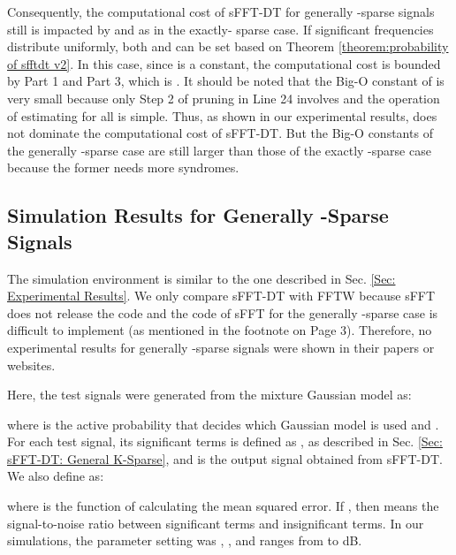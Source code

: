 \documentclass[journal,onecolumn,11pt]{IEEEtran}
\begin{document}
Consequently, the computational cost of sFFT-DT for generally -sparse signals still is impacted by  and  as in the exactly- sparse case.
If significant frequencies distribute uniformly, both  and  can be set based on Theorem \ref{theorem:probability of sfftdt v2}.
In this case, since  is a constant, the computational cost is bounded by Part 1 and Part 3, which is .
It should be noted that the Big-O constant of  is very small because only Step 2 of pruning in Line 24 involves  and the operation of estimating  for all  is simple.
Thus, as shown in our experimental results,  does not dominate the computational cost of sFFT-DT.
But the Big-O constants of the generally -sparse case are still larger than those of the exactly -sparse case because the former needs more syndromes.

\subsection{Simulation Results for Generally -Sparse Signals}\label{Sec: experimental result of General}
The simulation environment is similar to the one described in Sec. \ref{Sec: Experimental Results}.
We only compare sFFT-DT with FFTW because sFFT \cite{Haitham2012}\cite{Haitham2012_1} does not release the code and the code of sFFT for the generally -sparse case is difficult to implement (as mentioned in the footnote on Page 3).
Therefore, no experimental results for generally -sparse signals were shown in their papers or websites.

Here, the test signals were generated from the mixture Gaussian model as:
\small

\normalsize
where  is the active probability that decides which Gaussian model is used and . For each test signal, its significant terms is defined as , as described in Sec. \ref{Sec: sFFT-DT: General K-Sparse}, and  is the output signal obtained from sFFT-DT.
We also define
 as:
\small

\normalsize
where  is the function of calculating the mean squared error.
If , then  means the signal-to-noise ratio between significant terms and insignificant terms.
In our simulations, the parameter setting was , , and  ranges from  to  dB.
\end{document}
